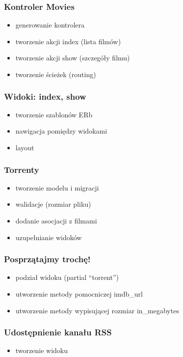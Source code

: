 \documentclass[12t]{beamer}
\begin{document}
\begin{frame}
  \frametitle{Kontroler Movies}
  \begin{itemize}
  \item generowanie kontrolera
  \item tworzenie akcji index (lista filmów)
  \item tworzenie akcji show (szczegóły filmu)
  \item tworzenie ścieżek (routing)
  \end{itemize}
\end{frame}

\begin{frame}
  \frametitle{Widoki: index, show}
  \begin{itemize}
  \item tworzenie szablonów ERb
  \item nawigacja pomiędzy widokami
  \item layout
  \end{itemize}
\end{frame}

\begin{frame}
  \frametitle{Torrenty}
  \begin{itemize}
  \item tworzenie modelu i migracji
  \item walidacje (rozmiar pliku)
  \item dodanie asocjacji z filmami
  \item uzupełnianie widoków
  \end{itemize}
\end{frame}

\begin{frame}
  \frametitle{Posprzątajmy trochę!}
  \begin{itemize}
  \item podział widoku (partial ``torrent'')
  \item utworzenie metody pomocniczej imdb\_url
  \item utworzenie metody wypisującej rozmiar in\_megabytes
  \end{itemize}
\end{frame}

\begin{frame}
  \frametitle{Udostępnienie kanału RSS}
  \begin{itemize}
  \item tworzenie widoku
  \end{itemize}
\end{frame}
\end{document}
